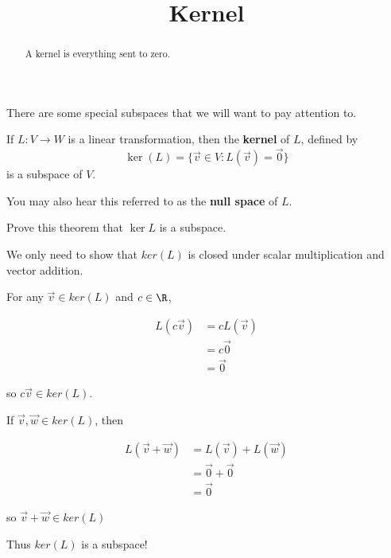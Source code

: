 \documentclass{ximera}
\title{Kernel}
\begin{document}
\begin{abstract}
	A kernel is everything sent to zero.
\end{abstract}

There are some special subspaces that we will want to pay attention to.

\begin{theorem}
  If $L:V \to W$ is a linear transformation, then the \textbf{kernel} of $L$, defined by $$\ker(L) = \{\vec{v} \in V:L(\vec{v}) = \vec{0}\}$$ is a subspace of $V$.
\end{theorem}

You may also hear this referred to as the \textbf{null space} of $L$.

Prove this theorem that $\ker L$ is a subspace.

\begin{free-response}
We only need to show that $ker(L)$ is closed under scalar multiplication and vector addition.

For any $\vec{v} \in ker(L)$ and $c \in \R$,

\begin{align*}
	L(c\vec{v}) &=cL(\vec{v})\\
		&=c\vec{0}\\
		&=\vec{0}
\end{align*}

so $c\vec{v} \in ker(L)$.

If $\vec{v},\vec{w} \in ker(L)$, then

\begin{align*}
	L(\vec{v}+\vec{w}) &= L(\vec{v})+L(\vec{w})\\
	&= \vec{0}+\vec{0}\\
	&=\vec{0}
\end{align*}

so $\vec{v}+\vec{w} \in ker(L)$

Thus $ker(L)$ is a subspace!

\end{free-response}
\end{document}
